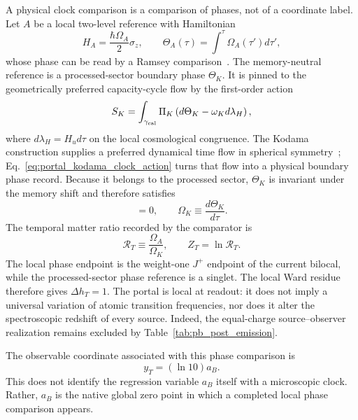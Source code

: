 \documentclass[aps,prd,twocolumn,10pt,superscriptaddress,nofootinbib]{revtex4-2}
\begin{document}
A physical clock comparison is a comparison of phases, not of a coordinate
label.  Let $A$ be a local two-level reference with Hamiltonian
\begin{equation}
 H_A=\frac{\hbar\Omega_A}{2}\sigma_z,
 \qquad
 \Theta_A(\tau)=\int^\tau\Omega_A(\tau')d\tau',
 \label{eq:portal_atomic_clock}
\end{equation}
whose phase can be read by a Ramsey comparison~\cite{Ramsey1950}.  The
memory-neutral reference is a processed-sector boundary phase $\Theta_K$.
It is pinned to the geometrically preferred capacity-cycle flow by the
first-order action
\begin{equation}
 S_K=\int_{\gamma_{\rm cal}}\Pi_K
 \left(d\Theta_K-\omega_K d\lambda_H\right),
 \label{eq:portal_kodama_clock_action}
\end{equation}
where $d\lambda_H=H_u d\tau$ on the local cosmological congruence.  The
Kodama construction supplies a preferred dynamical time flow in spherical
symmetry~\cite{Kodama1980,AbreuVisser2010}; Eq.~\eqref{eq:portal_kodama_clock_action}
turns that flow into a physical boundary phase record.  Because it belongs
to the processed sector, $\Theta_K$ is invariant under the memory shift and
therefore satisfies
\begin{equation}
 [D,\Omega_K]=0,
 \qquad
 \Omega_K\equiv\frac{d\Theta_K}{d\tau}.
 \label{eq:portal_kodama_neutral}
\end{equation}
The temporal matter ratio recorded by the comparator is
\begin{equation}
 \mathcal R_T\equiv\frac{\Omega_A}{\Omega_K},
 \qquad
 Z_T=\ln\mathcal R_T.
 \label{eq:portal_temporal_ratio_complete}
\end{equation}
The local phase endpoint is the weight-one $J^+$ endpoint of the current
bilocal, while the processed-sector phase reference is a singlet.  The
local Ward residue therefore gives $\Delta h_T=1$.  The portal is local at
readout: it does not imply a universal variation of atomic transition
frequencies, nor does it alter the spectroscopic redshift of every source.
Indeed, the equal-charge source--observer realization remains excluded by
Table~\ref{tab:pb_post_emission}.

The observable coordinate associated with this phase comparison is
\begin{equation}
 y_T=(\ln10)a_B .
 \label{eq:portal_temporal_native}
\end{equation}
This does not identify the regression variable $a_B$ itself with a
microscopic clock.  Rather, $a_B$ is the native global zero point in which a
completed local phase comparison appears.
\end{document}
